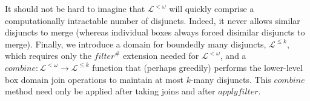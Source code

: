 It should not be hard to imagine that $\mathcal{L}^{<\omega}$ will quickly comprise
a computationally intractable number of disjuncts.
Indeed, it never allows similar disjuncts to merge
(whereas individual boxes always forced disimilar disjuncts to merge).
Finally, we introduce a domain for boundedly many disjuncts, $\mathcal{L}^{\leq k}$,
which requires only \rone the $\mathit{filter}^\#$ extension needed for $\mathcal{L}^{<\omega}$,
and \rtwo a $\mathit{combine} : \mathcal{L}^{<\omega} \rightarrow \mathcal{L}^{\leq k}$ function
that (perhaps greedily) performs the lower-level box domain join operations
to maintain at most $k$-many disjuncts.
This $\mathit{combine}$ method need only be applied after taking joins
and after $\mathit{applyfilter}$.
